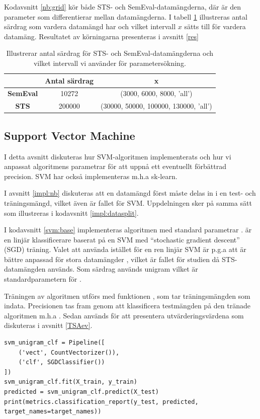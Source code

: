 \documentclass{kaumasters} %
\begin{document}
Kodavsnitt \ref{nb:grid} kör både STS- och SemEval-datamängderna, där  är den parameter som differentierar mellan datamängderna. I tabell \ref{tab:kbest} illustreras antal särdrag som vardera datamängd har och vilket intervall $x$ sätts till för vardera datamäng. Resultatet av körningarna presenteras i avsnitt \ref{res}

\begin{table}
\centering
\caption{Illustrerar antal särdrag för STS- och SemEval-datamängderna och vilket intervall vi använder för parametersökning.}
\label{tab:kbest}
    \begin{tabular}{ccc}
    \toprule
     & \textbf{Antal särdrag} & \textbf{x} \\
    \midrule
    \textbf{SemEval} & 10272 & (3000, 6000, 8000, 'all') \\ 
    \textbf{STS} & 200000 & (30000, 50000, 100000, 130000, 'all') \\
    \bottomrule
\end{tabular}
\end{table}




\subsection{Support Vector Machine}\label{impl:svm}
I detta avsnitt diskuteras hur SVM-algoritmen implementerats och hur vi anpassat algoritmens parametrar för att uppnå ett eventuellt förbättrad precision. SVM har också implementeras m.h.a sk-learn.

I avsnitt \ref{impl:nb} diskuteras att en datamängd först måste delas in i en test- och träningsmängd, vilket även är fallet för SVM. Uppdelningen sker på samma sätt som illustreras i kodavsnitt \ref{impl:datasplit}. 

I kodavsnitt \ref{svm:base} implementeras algoritmen  med standard parametrar \cite{scikit:009}.  är en linjär klassificerare baserat på en SVM med “stochastic gradient descent” (SGD) träning. Valet att använda  istället för en ren linjär SVM är p.g.a att  är bättre anpassad för stora datamängder \cite{scikit:008}, vilket är fallet för studien då STS-datamängden används. Som särdrag används unigram vilket är standardparametern för .

Träningen av algoritmen utförs med funktionen , som tar träningsmängden som indata. Precisionen tas fram genom att klassificera testmängden på den tränade algoritmen m.h.a . Sedan används  för att presentera utvärderingsvärdena som diskuteras i avsnitt \ref{TSAev}.
\begin{lstlisting}[style=mypython,caption={Kod för att skapa och träna SVM-klassificeraren.},label=svm:base]
svm_unigram_clf = Pipeline([
	('vect', CountVectorizer()), 
	('clf', SGDClassifier())
])
svm_unigram_clf.fit(X_train, y_train)
predicted = svm_unigram_clf.predict(X_test)
print(metrics.classification_report(y_test, predicted, target_names=target_names))
\end{lstlisting}
\end{document}

